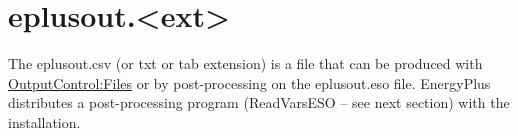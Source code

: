 \section{eplusout.\textless{}ext\textgreater{}}\label{eplusout.ext}

The eplusout.csv (or txt or tab extension) is a file that can be produced with \hyperref[outputcontrolfiles]{OutputControl:Files} or by post-processing on the eplusout.eso file. EnergyPlus distributes a post-processing program (ReadVarsESO -- see next section) with the installation.
